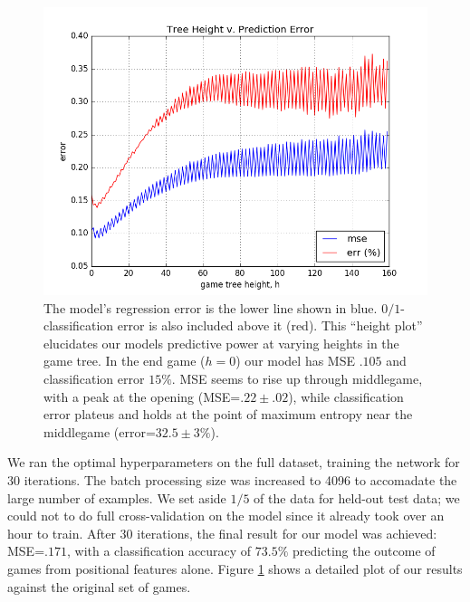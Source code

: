 \documentclass{article}
\begin{document}
\begin{figure}[h]
\centering
\includegraphics[scale=.5]{assets/figure-hplot.png}
\caption{The model's regression error is the lower line shown in blue.  $0/1$-classification error is also included above it (red).  This ``height plot'' elucidates our models predictive power at varying heights in the game tree.  In the end game ($h=0$) our model has MSE $.105$ and classification error $15\%$.  MSE seems to rise up through middlegame, with a peak at the opening (MSE=$.22\pm .02$), while classification error plateus and holds at the point of maximum entropy near the middlegame (error=$32.5\pm 3 \%$). \label{fig:hplot}}
\end{figure}

We ran the optimal hyperparameters on the full dataset, training the network for 30 iterations.  The batch processing size was increased to 4096 to accomadate the large number of examples.  We set aside $1/5$ of the data for held-out test data; we could not to do full cross-validation on the model since it already took over an hour to train.  After 30 iterations, the final result for our model was achieved: MSE=$.171$, with a classification accuracy of $73.5\%$ predicting the outcome of games from positional features alone.  Figure \ref{fig:hplot} shows a detailed plot of our results against the original set of games.
\end{document}
